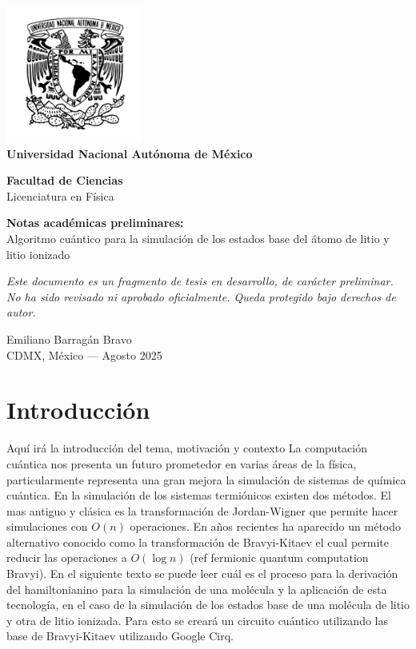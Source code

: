 \documentclass[12pt, oneside]{article}
\begin{document}
\begin{titlepage}
	\setlength{\parindent}{0pt} \setlength{\parskip}{0pt}
	\begin{center}
		\vfill
		\includegraphics[width=4.5cm]{UNAM_LOGO2.png} \\[1em]
		\Huge\textbf{Universidad Nacional Autónoma de México}
		\vspace{1cm}

		\Large\textbf{Facultad de Ciencias} \\[0.5em]
		Licenciatura en Física
		\vfill

		\Large\textbf{Notas académicas preliminares:} \\
		\large Algoritmo cuántico para la simulación de los estados base del átomo de litio y litio ionizado
		\vspace{1.5cm}

		\textit{Este documento es un fragmento de tesis en desarrollo, de carácter preliminar.} \\
		\textit{No ha sido revisado ni aprobado oficialmente. Queda protegido bajo derechos de autor.}
		\vfill

		\large Emiliano Barragán Bravo \\
		CDMX, México — Agosto 2025
	\end{center}
\end{titlepage}

\section{Introducción}
Aquí irá la introducción del tema, motivación y contexto La computación cuántica nos presenta un futuro prometedor en varias áreas de la física, particularmente representa una gran mejora la simulación de sistemas de química cuántica. En la simulación de los sistemas termiónicos existen dos métodos. El mas antiguo y clásica es la transformación de Jordan-Wigner que permite hacer simulaciones con $O(n)$ operaciones. En años recientes ha aparecido un método alternativo conocido como la transformación de Bravyi-Kitaev el cual permite reducir las operaciones a $O(\log n)$ (ref fermionic quantum computation Bravyi). En el siguiente texto se puede leer cuál es el proceso para la derivación del hamiltonianino para la simulación de una molécula y la aplicación de esta tecnología, en el caso de la simulación de los estados base de una molécula de litio y otra de litio ionizada. Para esto se creará un circuito cuántico utilizando las base de Bravyi-Kitaev utilizando Google Cirq.\\
\end{document}
